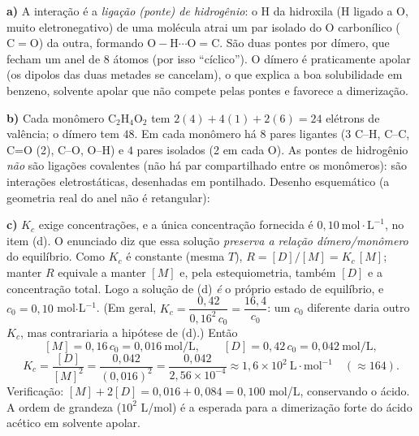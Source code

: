 \documentclass{article}%
\begin{document}
\textbf{a)} A interação é a \emph{ligação (ponte) de hidrogênio}: o H da hidroxila (H ligado a O, muito eletronegativo) de uma molécula atrai um par isolado do O carbonílico ($\mathrm{C{=}O}$) da outra, formando $\mathrm{O{-}H\cdots O{=}C}$. São duas pontes por dímero, que fecham um anel de 8 átomos (por isso ``cíclico''). O dímero é praticamente apolar (os dipolos das duas metades se cancelam), o que explica a boa solubilidade em benzeno, solvente apolar que não compete pelas pontes e favorece a dimerização.

\textbf{b)} Cada monômero $\mathrm{C_2H_4O_2}$ tem $2(4)+4(1)+2(6)=24$ elétrons de valência; o dímero tem $48$. Em cada monômero há $8$ pares ligantes ($3$ C--H, C--C, C=O (2), C--O, O--H) e $4$ pares isolados (2 em cada O). As pontes de hidrogênio \emph{não} são ligações covalentes (não há par compartilhado entre os monômeros): são interações eletrostáticas, desenhadas em pontilhado. Desenho esquemático (a geometria real do anel não é retangular):
\begin{center}
\end{center}

\textbf{c)} $K_c$ exige concentrações, e a única concentração fornecida é $0{,}10\ \text{mol}\cdot\text{L}^{-1}$, no item (d). O enunciado diz que essa solução \emph{preserva a relação dímero/monômero} do equilíbrio. Como $K_c$ é constante (mesma $T$), $R=[D]/[M]=K_c\,[M]$; manter $R$ equivale a manter $[M]$ e, pela estequiometria, também $[D]$ e a concentração total. Logo a solução de (d) \emph{é} o próprio estado de equilíbrio, e $c_0=0{,}10$ mol$\cdot$L$^{-1}$. (Em geral, $K_c=\dfrac{0{,}42}{0{,}16^{2}\,c_0}=\dfrac{16{,}4}{c_0}$: um $c_0$ diferente daria outro $K_c$, mas contrariaria a hipótese de (d).) Então
\[
[M]=0{,}16\,c_0=0{,}016\ \text{mol/L},\qquad [D]=0{,}42\,c_0=0{,}042\ \text{mol/L},
\]
\[
K_c=\frac{[D]}{[M]^2}=\frac{0{,}042}{(0{,}016)^2}=\frac{0{,}042}{2{,}56\times10^{-4}}\approx 1{,}6\times 10^{2}\ \text{L}\cdot\text{mol}^{-1}\quad(\approx 164).
\]
Verificação: $[M]+2[D]=0{,}016+0{,}084=0{,}100$ mol/L, conservando o ácido. A ordem de grandeza ($10^2$ L/mol) é a esperada para a dimerização forte do ácido acético em solvente apolar.
\end{document}
